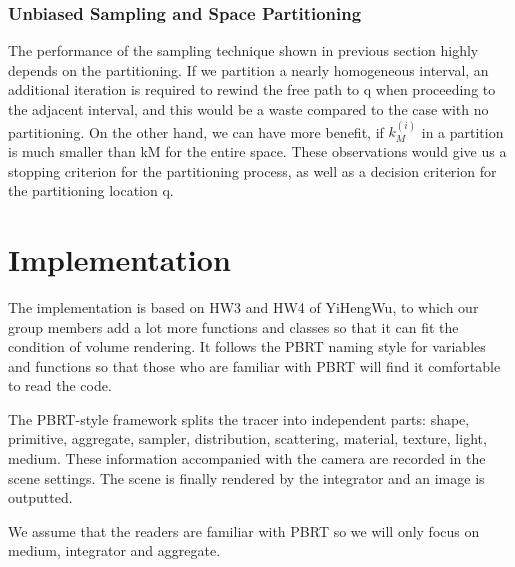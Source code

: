 \documentclass[acmtog]{acmart}
\begin{document}
\subsubsection{Unbiased Sampling and Space Partitioning}
The performance of the sampling technique shown in previous section highly depends on the partitioning. If we partition a nearly homogeneous interval, an additional iteration is required to rewind the free path to q when proceeding to the adjacent interval, and this
would be a waste compared to the case with no partitioning. On the other hand, we can have more benefit, if $k_M^{(i)}$ in a partition is much smaller than kM for the entire space. These observations would give us a stopping criterion for the partitioning process, as well as a decision criterion for the partitioning location q.

\section{Implementation}
The implementation is based on HW3 and HW4 of YiHengWu, to which our group members add a lot more functions and classes so that it can fit the condition of volume rendering.
It follows the PBRT naming style for variables and functions so that those who are familiar with PBRT will find it comfortable to read the code.\par
The PBRT-style framework splits the tracer into independent parts: 
shape, primitive, aggregate, sampler, distribution, scattering, material, texture, light, medium.
These information accompanied with the camera are recorded in the scene settings.
The scene is finally rendered by the integrator and an image is outputted.\par
We assume that the readers are familiar with PBRT so we will only focus on medium, integrator and aggregate.
\end{document}

